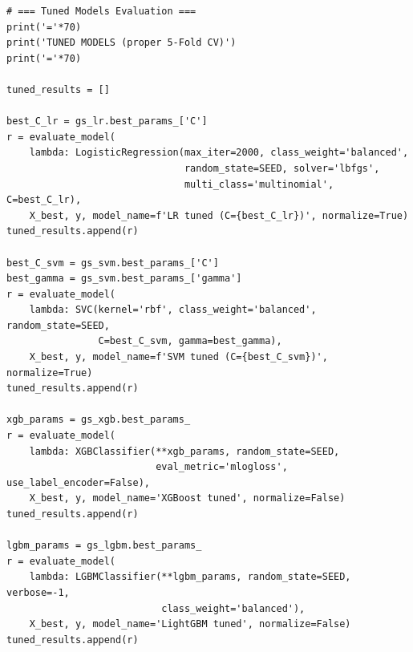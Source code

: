 \begin{lstlisting}
# === Tuned Models Evaluation ===
print('='*70)
print('TUNED MODELS (proper 5-Fold CV)')
print('='*70)
 
tuned_results = []
 
best_C_lr = gs_lr.best_params_['C']
r = evaluate_model(
    lambda: LogisticRegression(max_iter=2000, class_weight='balanced',
                               random_state=SEED, solver='lbfgs',
                               multi_class='multinomial', C=best_C_lr),
    X_best, y, model_name=f'LR tuned (C={best_C_lr})', normalize=True)
tuned_results.append(r)
 
best_C_svm = gs_svm.best_params_['C']
best_gamma = gs_svm.best_params_['gamma']
r = evaluate_model(
    lambda: SVC(kernel='rbf', class_weight='balanced', random_state=SEED,
                C=best_C_svm, gamma=best_gamma),
    X_best, y, model_name=f'SVM tuned (C={best_C_svm})', normalize=True)
tuned_results.append(r)
 
xgb_params = gs_xgb.best_params_
r = evaluate_model(
    lambda: XGBClassifier(**xgb_params, random_state=SEED,
                          eval_metric='mlogloss', use_label_encoder=False),
    X_best, y, model_name='XGBoost tuned', normalize=False)
tuned_results.append(r)
 
lgbm_params = gs_lgbm.best_params_
r = evaluate_model(
    lambda: LGBMClassifier(**lgbm_params, random_state=SEED, verbose=-1,
                           class_weight='balanced'),
    X_best, y, model_name='LightGBM tuned', normalize=False)
tuned_results.append(r)
\end{lstlisting}
 
